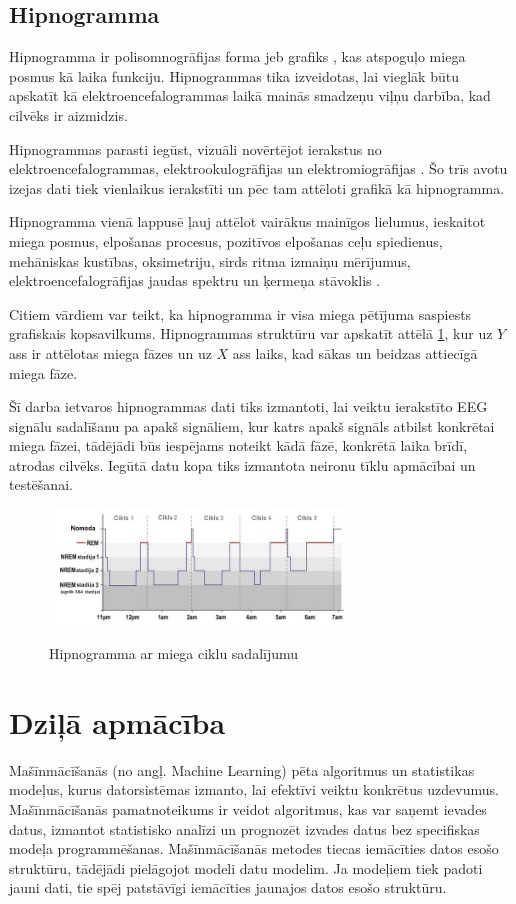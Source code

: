 \documentclass[12pt,paper=A4]{report}
\begin{document}
    \section{Hipnogramma}
    Hipnogramma ir polisomnogrāfijas forma jeb grafiks \cite{wiki:xxx}, kas atspoguļo miega posmus kā laika funkciju. Hipnogrammas tika izveidotas, lai vieglāk būtu apskatīt kā elektroencefalogrammas laikā mainās smadzeņu viļņu darbība, kad cilvēks ir aizmidzis. 
    
Hipnogrammas parasti iegūst, vizuāli novērtējot ierakstus no elektroencefalogrammas, elektrookulogrāfijas un elektromiogrāfijas \cite{cabiddu2012modulation}. Šo trīs avotu izejas dati tiek vienlaikus ierakstīti un pēc tam attēloti grafikā kā hipnogramma. 

 Hipnogramma vienā lappusē ļauj attēlot vairākus mainīgos lielumus, ieskaitot miega posmus, elpošanas procesus, pozitīvos elpošanas ceļu spiedienus, mehāniskas kustības, oksimetriju, sirds ritma izmaiņu mērījumus, elektroencefalogrāfijas jaudas spektru un ķermeņa stāvoklis \cite{Hypnogramm}. 
   
Citiem vārdiem var teikt, ka hipnogramma ir visa miega pētījuma saspiests grafiskais kopsavilkums. Hipnogrammas struktūru var apskatīt attēlā \ref{hypnoExample}, kur uz $Y$ ass ir attēlotas miega fāzes un uz $X$ ass laiks, kad sākas un beidzas attiecīgā miega fāze.
     
    Šī darba ietvaros hipnogrammas dati tiks izmantoti, lai veiktu ierakstīto EEG signālu sadalīšanu pa apakš signāliem, kur katrs apakš signāls atbilst konkrētai miega fāzei, tādējādi būs iespējams noteikt kādā fāzē, konkrētā laika brīdī, atrodas cilvēks. Iegūtā datu kopa tiks izmantota neironu tīklu apmācībai un testēšanai.
    
\begin{figure}[H] \centering
\includegraphics[width=0.70\textwidth]{sleepHypno} 
\caption{Hipnogramma ar miega ciklu sadalījumu} \cite{thebrain} \label{hypnoExample} 
\end{figure}

 \chapter{Dziļā apmācība}
Mašīnmācīšanās (no angļ. Machine Learning) pēta algoritmus un statistikas modeļus, kurus datorsistēmas izmanto, lai efektīvi veiktu konkrētus uzdevumus. Mašīnmācīšanās pamatnoteikums ir veidot algoritmus, kas var saņemt ievades datus, izmantot statistisko analīzi un prognozēt izvades datus bez specifiskas modeļa programmēšanas. Mašīnmācīšanās metodes tiecas iemācīties datos esošo struktūru, tādējādi pielāgojot modeli datu modelim. Ja modeļiem tiek padoti jauni dati, tie spēj patstāvīgi iemācīties jaunajos datos esošo struktūru.
\end{document}
